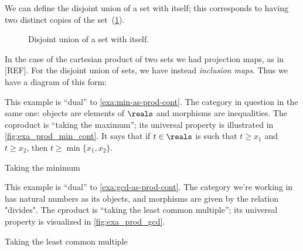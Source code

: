 We can define the disjoint union of a set with itself; this corresponds to having two distinct copies of the set~(\cref{fig:disjointself}).

\begin{figure}[h!]
  \begin{center}
    \caption{Disjoint union of a set with itself.}
    \label{fig:disjointself}
  \end{center}
\end{figure}

In the case of the cartesian product of two sets we had projection maps, as in [REF]. For the disjoint union of sets, we have instead \emph{inclusion maps}. Thus we have a diagram of this form: 


  \begin{figure}[h!]
  \begin{center}
  \end{center}
    \label{fig:coprod_disunion_diagram}
  \end{figure}


\begin{example}\label{exa:min-as-prod-cont}
This example is ``dual'' to \cref{exa:min-as-prod-cont}. The category in question in the same one: objects are elements of $\reals$ and morphisms are inequalities. The coproduct is ``taking the maximum''; its universal property is illustrated in \cref{fig:exa_prod_min_cont}. It says that if $t \in \reals$ is such that $t \geq x_1$ and $t \geq x_2$, then $t \geq \min \{ x_1, x_2 \}$. 
  \begin{marginfigure}
  \begin{center}
  \end{center}
    \caption{Taking the minimum}
    \label{fig:exa_coprod_max_cont}
  \end{marginfigure}
\end{example}

\begin{example}\label{exa:lcm-as-coprod-cont}
This example is ``dual'' to \cref{exa:gcd-as-prod-cont}. The category we're working in has natural numbers as its objects, and morphisms are given by the relation "divides". The cproduct is ``taking the least common multiple''; its universal property is visualized in \cref{fig:exa_prod_gcd}. 
  \begin{marginfigure}
  \begin{center}
  \end{center}
    \caption{Taking the least common multiple}
    \label{fig:exa_coprod_lcm_cont}
  \end{marginfigure}
\end{example}

